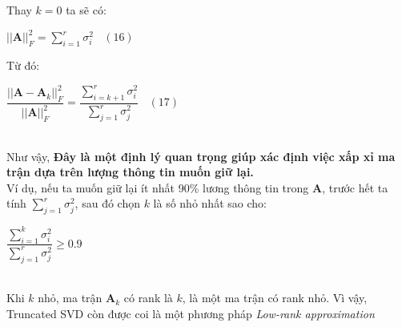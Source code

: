 \\Thay $k=0$ ta sẽ có:\\
\begin{center}
	$||\mathbf{A}||_F^2 = \sum_{i = 1}^r \sigma_i^2~~~~ (16) $
\end{center} 
Từ đó:\\
\begin{center}
	$
	\dfrac{||\mathbf{A} - \mathbf{A}_k||_F^2}{||\mathbf{A}||_F^2} = {\dfrac{\sum_{i = k + 1}^r \sigma_i^2}{\sum_{j = 1}^r \sigma_j^2}} ~~~~ (17)$
\end{center}
\\
Như vậy, \textbf{ Đây là một định lý quan trọng giúp xác định việc xấp xỉ ma trận dựa trên lượng thông tin muốn giữ lại.}\\
Ví dụ, nếu ta muốn giữ lại ít nhất 90\% lương thông tin trong $\mathbf{A}$, trước hết ta tính $\sum_{j = 1}^r \sigma_j^2$, sau đó chọn $k$ là số nhỏ nhất sao cho:\\
\begin{center}
	$
	\dfrac{\sum_{i = 1}^k \sigma_i^2}{\sum_{j = 1}^r \sigma_j^2} \geq 0.9$
\end{center}
\\
Khi $k$ nhỏ, ma trận $\mathbf{A}_k$ có rank là $k$, là một ma trận có rank nhỏ. Vì vậy, Truncated SVD còn được coi là một phương pháp \textit{Low-rank approximation}\\

